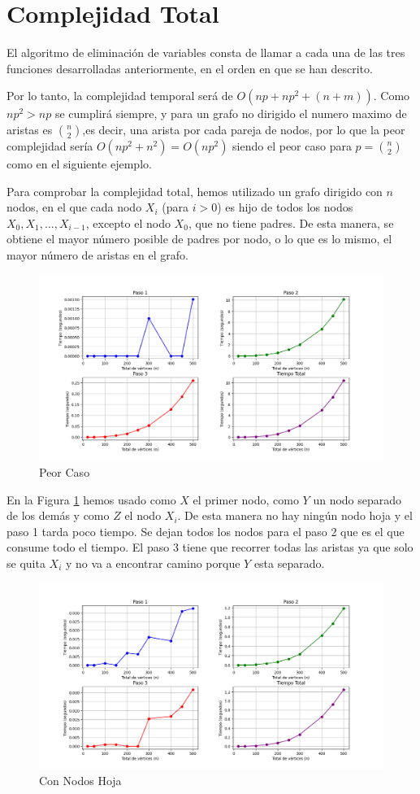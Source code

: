 \documentclass[a4paper,12pt]{article}
\begin{document}
\section{Complejidad Total}
El algoritmo de eliminación de variables consta de llamar a cada una de las tres funciones desarrolladas anteriormente, en el orden en que se han descrito.

Por lo tanto, la complejidad temporal será de $O(np+np^2+(n+m))$. Como $np^2 > np$ se cumplirá siempre, y para un grafo no dirigido el numero maximo de aristas es $\binom{n}{2}$,es decir, una arista por cada pareja de nodos, por lo que la peor complejidad sería $O(np^2 + n^2) = O(np^2)$ siendo el peor caso para $p = \binom{n}{2}$ como en el siguiente ejemplo.

Para comprobar la complejidad total, hemos utilizado un grafo dirigido con $n$ nodos, 
en el que cada nodo $X_i$ (para $i > 0$) es hijo de todos los nodos $X_0, X_1, \dots, X_{i-1}$, 
excepto el nodo $X_0$, que no tiene padres. 
De esta manera, se obtiene el mayor número posible de padres por nodo,  o lo que es lo mismo, el mayor número de aristas en el grafo.

\begin{figure}[h!]
    \centering
    \includegraphics[width=0.8\linewidth]{SinQuitarNodosHoja.png}
    \caption{Peor Caso}
    \label{fig:peorcaso}
\end{figure}

En la Figura \ref{fig:peorcaso} hemos usado como $X$ el primer nodo, como $Y$ un nodo separado de los demás y como $Z$ el nodo $X_i$. De esta manera no hay ningún nodo hoja y el paso 1 tarda poco tiempo. Se dejan todos los nodos para el paso 2 que es el que consume todo el tiempo. El paso 3 tiene que recorrer todas las aristas ya que solo se quita $X_i$ y no va a encontrar camino porque $Y$ esta separado.


\begin{figure}[!h]
    \centering
    \includegraphics[width=0.8\linewidth]{NodosHojaHastaMitad.png}
    \caption{Con Nodos Hoja}
    \label{fig:nodosHoja}
\end{figure}
\end{document}
